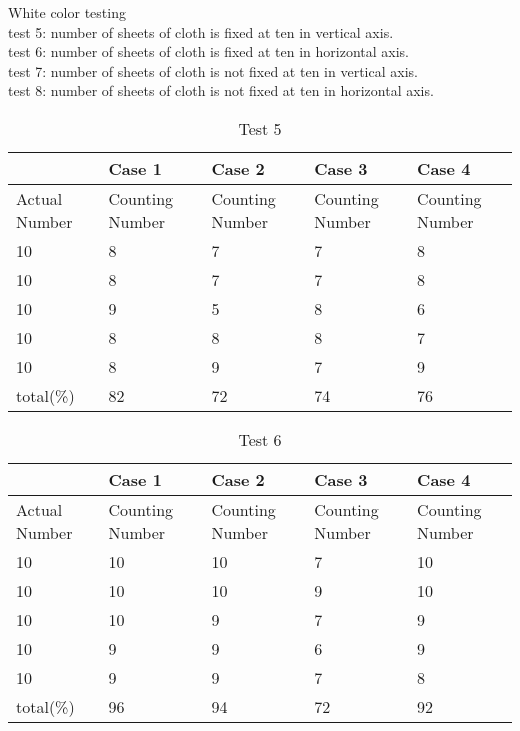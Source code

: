 White color testing\\
test 5: number of sheets of cloth is fixed at ten in vertical axis.\\ 
test 6: number of sheets of cloth is fixed at ten in horizontal axis.\\ 
test 7: number of sheets of cloth is not fixed at ten in vertical axis.\\ 
test 8: number of sheets of cloth is not fixed at ten in horizontal axis.\\
\begin{table}[t]
	\centering
	\begin{tabular}{|p{1.5cm}|p{1.5cm}|p{1.5cm}|p{1.5cm}|p{1.5cm}|}
		\hline
		& Case 1 & Case 2 & Case 3 & Case 4\\
		\hline
		Actual Number & Counting Number & Counting Number & Counting Number & Counting Number\\
		\hline
	10	& 	8	&  	7	&  	7	& 8	\\
	10	& 	 8	& 	7	& 	7	& 8	\\
	10	& 	9	&	5	& 	8	& 6	\\
	10	& 	8	& 	8	& 	8	& 7	\\
	10	& 	8	& 	9	& 	7	& 9	\\
		total(\%)& 	82	&	72	&	74	& 76	\\
		\hline
	\end{tabular}
	\caption{Test 5} \label{teb:test805}
\end{table}
\begin{table}[t]
	\centering
	\begin{tabular}{|p{1.5cm}|p{1.5cm}|p{1.5cm}|p{1.5cm}|p{1.5cm}|}
		\hline
		& Case 1 & Case 2 & Case 3 & Case 4\\
		\hline
		Actual Number & Counting Number & Counting Number & Counting Number & Counting Number\\
		\hline
	10	& 	10	&  10	&  	7	& 10	\\
	10	& 	 10	& 	10	& 	9	& 10	\\
	10	& 	10	&	9	& 	7	& 9	\\
	10	& 	9	& 	9	& 	6	& 9	\\
	10	& 	9	& 	9	& 	7	& 8	\\
		total(\%)& 	96	&	94	&	72	& 92\\
		\hline
	\end{tabular}
	\caption{Test 6} \label{teb:test806}
\end{table}
